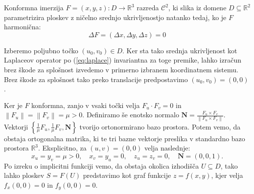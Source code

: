 \documentclass[fin1, tisk, bibtex]{fmfdelo}
\begin{document}
\begin{trditev} \label{thm:konformna_harmonica_imerzija}
    Konformna imerzija $F=(x, y, z): D \rightarrow \mathbb{R}^3$ razreda $\mathcal{C}^2$, ki slika iz domene $D \subseteq\mathbb{R}^2$ parametrizira ploskev z ničelno srednjo ukrivljenostjo natanko tedaj, ko je $F$ harmonična:
    \begin{equation*}
        \Delta F=(\Delta x, \Delta y, \Delta z)=0
    \end{equation*}
\end{trditev} 
\begin{dokaz}
    Izberemo poljubno točko $(u_0,v_0) \in D$. Ker sta tako srednja ukrivljenost kot Laplaceov operator po (\ref{eq:laplace}) invariantna za toge premike, lahko izračun brez škode za splošnost izvedemo v primerno izbranem koordinatnem sistemu. Brez škode za splošnost tako preko translacije predpostavimo $\left(u_0, v_0\right)=(0,0)$. 
    

    Ker je $F$ konformna, zanjo v vsaki točki velja $F_u \cdot F_v=0$ in $\left\|F_u\right\|=\left\|F_v\right\|=\mu>0$. Definiramo še enotsko normalo $\mathbf{N}=\frac{F_u \times F_v}{\left\|F_u \times F_v\right\|}$. Vektorji $\left\{\frac{1}{\mu} F_u, \frac{1}{\mu} F_v, \mathbf{N}\right\}$ tvorijo ortonormirano bazo prostora. Potem vemo, da obstaja ortogonalna matrika, ki te tri bazne vektorje preslika v standardno bazo prostora $\mathbb{R}^3$. Eksplicitno, za $(u, v)=(0,0)$ velja naslednje: 
    \begin{equation}
        x_u=y_v=\mu>0, \quad x_v=y_u=0, \quad z_u=z_v=0, \quad \mathbf{N} = (0,0,1) . \label{eq:odvodi}
    \end{equation}
    Po izreku o implicitni funkciji vemo, da obstaja okolica izhodišča $U \subseteq D$, tako lahko ploskev $S=F(U)$ predstavimo kot graf funkcije $z=f(x, y)$, kjer velja $f_x(0,0)=0$ in $f_y(0,0)=0$.


\end{dokaz}
\end{document}
